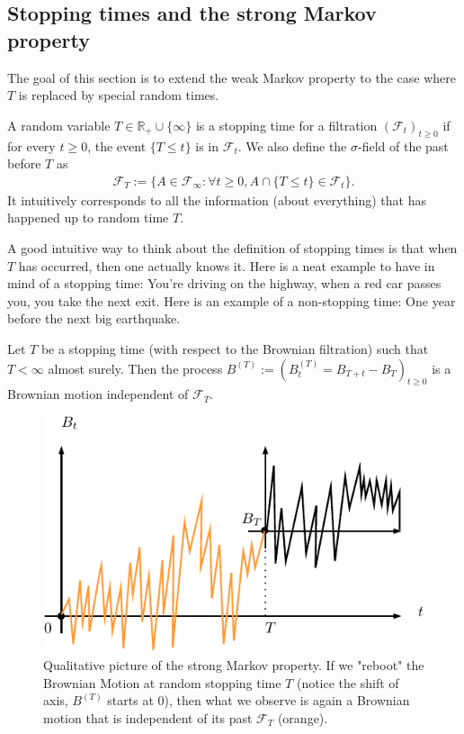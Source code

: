 \documentclass[../mainfile.tex]{subfiles}
\begin{document}
\subsection{Stopping times and the strong Markov property}
The goal of this section is to extend the weak Markov property to the case where $T$ is replaced by special random times.
\begin{defn} A random variable $T \in \mathbb{R}_+ \cup \{ \infty\}$ is a stopping time for a filtration $( \mathcal{F}_t)_{t \geq 0}$ if for every $t \geq 0$, the event $ \{T \leq t \}$ is in $\mathcal{F}_t$. We also define the $\sigma$-field of the past before $T$ as 
\begin{align*}
\mathcal{F}_T := \{ A \in \mathcal{F}_\infty : \forall t \geq 0, A \cap \{T \leq t \} \in \mathcal{F}_t \}.
\end{align*}
It intuitively corresponds to all the information (about everything) that has happened up to random time $T$. 
\end{defn}
\begin{rem} A good intuitive way to think about the definition of stopping times is that when $T$ has occurred, then one actually knows it. Here is a neat example to have in mind of a stopping time: You're driving on the highway, when a red car passes you, you take the next exit. Here is an example of a non-stopping time: One year before the next big earthquake. 
\end{rem}
\begin{prop} Let $T$ be a stopping time (with respect to the Brownian filtration) such that $T< \infty$ almost surely. Then the process $B^{(T)} := (B_t^{(T)}=B_{T+t}-B_T)_{t \geq 0}$ is a Brownian motion independent of $\mathcal{F}_T$. 
\end{prop}
\begin{figure}[hbtp]
\centering
\includegraphics[scale=.932]{markovprop.pdf}
\caption{Qualitative picture of the strong Markov property. If we "reboot" the Brownian Motion at random stopping time $T$ (notice the shift of axis, $B^{(T)}$ starts at $0$), then what we observe is again a Brownian motion that is independent of its past $\mathcal{F}_T$ (orange).}
\end{figure}
\end{document}
